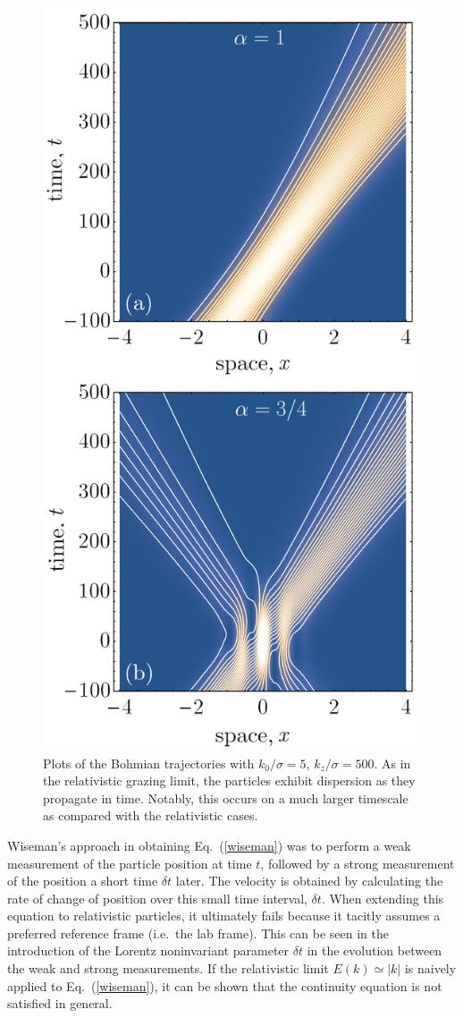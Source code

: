\documentclass[12pt,prx,
,nofootinbib
,floatfix
,superscriptaddress
]{revtex4-2}
\begin{document}
\begin{figure}[htp]
    \centering
    \includegraphics[width=0.8\linewidth]{Fig3paraxialtrajectoriesb.png}
    \caption{Plots of the Bohmian trajectories with $k_0/\sigma = 5$, $k_z/\sigma = 500$. As in the relativistic grazing limit, the particles exhibit dispersion as they propagate in time. Notably, this occurs on a much larger timescale as compared with the relativistic cases.}
    \label{fig:paraxial}
\end{figure}
Wiseman's approach in obtaining Eq.\ (\ref{wiseman}) was to perform a weak measurement of the particle position at time $t$, followed by a strong measurement of the position a short time $\delta t$ later. The velocity is obtained by calculating the rate of change of position over this small time interval, $\delta t$. When extending this equation to relativistic particles, it ultimately fails because it tacitly assumes a preferred reference frame (i.e.\ the lab frame). This can be seen in the introduction of the Lorentz noninvariant parameter $\delta t$ in the evolution between the weak and strong measurements. If the relativistic limit $E(k) \simeq |k|$ is naively applied to Eq.\ (\ref{wiseman}), it can be shown that the continuity equation is not satisfied in general. 
\end{document}

